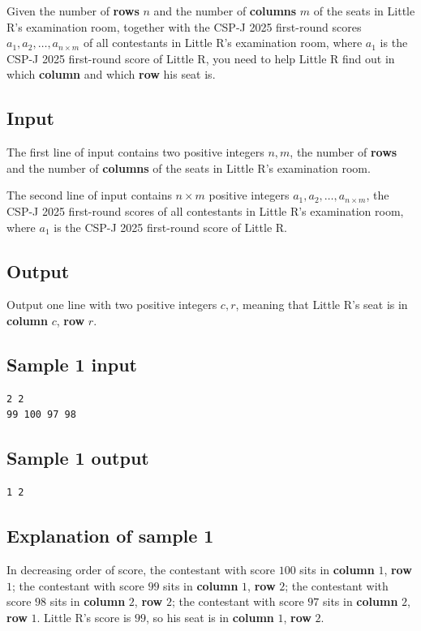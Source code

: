 \documentclass[11pt]{article}
\begin{document}
Given the number of \textbf{rows} $n$ and the number of \textbf{columns}
$m$ of the seats in Little R's examination room,
together with the CSP-J 2025 first-round scores
$a_1, a_2, \dots, a_{n \times m}$ of all contestants in Little R's
examination room, where $a_1$ is the CSP-J 2025 first-round score of
Little R,
you need to help Little R find out in which \textbf{column} and which
\textbf{row} his seat is.

\subsection*{Input}

The first line of input contains two positive integers $n, m$,
the number of \textbf{rows} and the number of \textbf{columns} of the seats
in Little R's examination room.

The second line of input contains $n \times m$ positive integers
$a_1, a_2, \dots, a_{n \times m}$,
the CSP-J 2025 first-round scores of all contestants in Little R's
examination room, where $a_1$ is the CSP-J 2025 first-round score of
Little R.

\subsection*{Output}

Output one line with two positive integers $c, r$,
meaning that Little R's seat is in \textbf{column} $c$, \textbf{row} $r$.

\subsection*{Sample 1 input}
\begin{verbatim}
2 2
99 100 97 98
\end{verbatim}

\subsection*{Sample 1 output}
\begin{verbatim}
1 2
\end{verbatim}

\subsection*{Explanation of sample 1}

In decreasing order of score,
the contestant with score $100$ sits in \textbf{column} $1$,
\textbf{row} $1$;
the contestant with score $99$ sits in \textbf{column} $1$,
\textbf{row} $2$;
the contestant with score $98$ sits in \textbf{column} $2$,
\textbf{row} $2$;
the contestant with score $97$ sits in \textbf{column} $2$,
\textbf{row} $1$.
Little R's score is $99$,
so his seat is in \textbf{column} $1$, \textbf{row} $2$.
\end{document}
